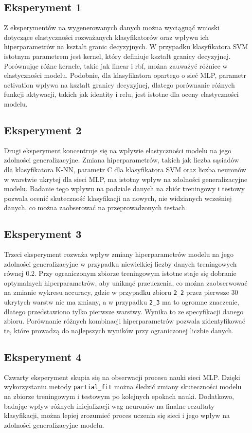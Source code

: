 \documentclass[12pt]{article}
\begin{document}
\subsection*{Eksperyment 1}
Z eksperymentów na wygenerowanych danych można wyciągnąć wnioski dotyczące 
elastyczności rozważanych klasyfikatorów oraz wpływu ich hiperparametrów na 
kształt granic decyzyjnych. W przypadku klasyfikatora SVM istotnym parametrem 
jest kernel, który definiuje kształt granicy decyzyjnej. Porównując różne kernele, 
takie jak linear i rbf, można zauważyć różnice w elastyczności modelu. 
Podobnie, dla klasyfikatora opartego o sieć MLP, parametr activation wpływa na 
kształt granicy decyzyjnej, dlatego porównanie różnych funkcji aktywacji, 
takich jak identity i relu, jest istotne dla oceny elastyczności modelu.
\subsection*{Eksperyment 2}
Drugi eksperyment koncentruje się na wpływie elastyczności modelu na 
jego zdolności generalizacyjne. Zmiana hiperparametrów, takich jak liczba 
sąsiadów dla klasyfikatora K-NN, parametr C dla klasyfikatora SVM oraz liczba 
neuronów w warstwie ukrytej dla sieci MLP, ma istotny wpływ na zdolności 
generalizacyjne modelu. Badanie tego wpływu na podziale danych na zbiór treningowy 
i testowy pozwala ocenić skuteczność klasyfikacji na nowych, 
nie widzianych wcześniej danych, co można zaobserować na przeprowadzonych testach.
\subsection*{Eksperyment 3}
Trzeci eksperyment rozważa wpływ zmiany hiperparametrów modelu na jego zdolności 
generalizacyjne w przypadku niewielkiej liczby danych treningowych równej 0.2.
Przy ograniczonym zbiorze treningowym istotne staje się dobranie optymalnych hiperparametrów, 
aby uniknąć przeuczenia, co można zaobserwować na zmianie wykresu accuracy, 
gdzie w przypadku zbioru \texttt{2_2} przez pierwsze 30 ukrytych warstw 
nie ma zmiany, a w przypadku \texttt{2_3} ma to ogromne znaczenie, dlatego przedstawiono tylko pierwsze warstwy.
Wynika to ze specyfikacji danego zbioru.
Porównanie różnych kombinacji hiperparametrów pozwala zidentyfikować te, które prowadzą do najlepszych wyników 
przy ograniczonej liczbie danych.
\subsection*{Eksperyment 4}
Czwarty eksperyment skupia się na obserwacji procesu nauki sieci MLP. 
Dzięki wykorzystaniu metody \texttt{partial\_fit} 
można śledzić zmiany skuteczności modelu na zbiorze treningowym i 
testowym po kolejnych epokach nauki. 
Dodatkowo, badając wpływ różnych inicjalizacji wag neuronów na finalne 
rezultaty klasyfikacji, można lepiej 
zrozumieć proces uczenia się sieci i jego wpływ na zdolności generalizacyjne modelu.
\end{document}
